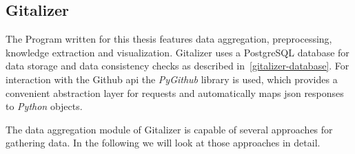 \subsection{Gitalizer}
The Program written for this thesis features data aggregation, preprocessing, knowledge extraction and visualization.
Gitalizer uses a PostgreSQL database for data storage and data consistency checks as described in~\ref{gitalizer-database}.
For interaction with the Github \ac{api} the \emph{PyGithub} library is used, which provides a convenient abstraction layer for requests and automatically maps \ac{json} responses to \emph{Python} objects.

The data aggregation module of Gitalizer is capable of several approaches for gathering data.
In the following we will look at those approaches in detail.

